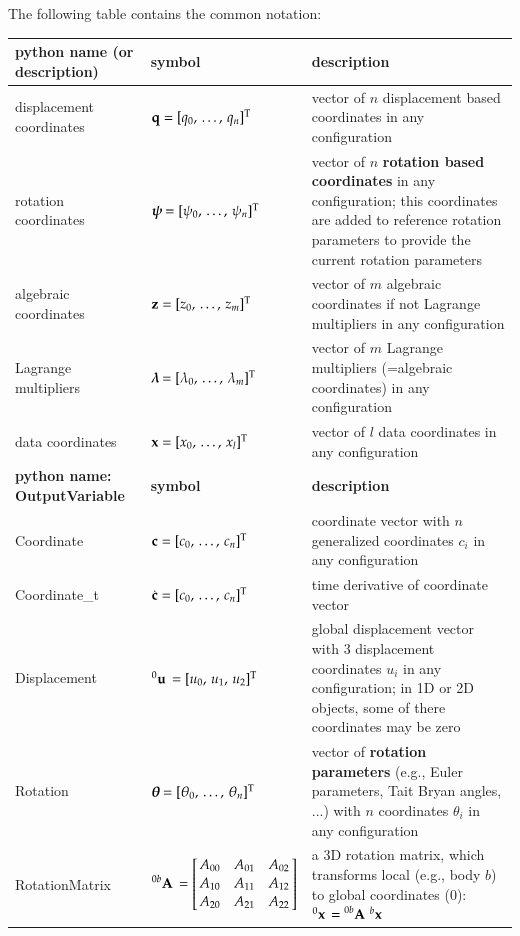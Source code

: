 \documentclass[11pt,a4paper]{book} %
\begin{document}
\noindent The following table contains the common notation: \vspace{-12pt}
\begin{center}
  \footnotesize
  \begin{longtable}{| p{5cm} | p{5cm} | p{6cm} |}
    \hline
    \bf python name (or description) & \bf symbol & \bf description \\ \hline
    displacement coordinates & $\mathbf{q} = [q_0,\, \ldots,\, q_n]^\mathrm{T}$ & vector of $n$ displacement based coordinates in any configuration\\ \hline
    rotation coordinates & $\mbox{\boldmath $\psi$ \unboldmath}\!\! = [\psi_0,\, \ldots,\, \psi_n]^\mathrm{T}$ & vector of $n$ {\bf rotation based coordinates} in any configuration; this coordinates are added to reference rotation parameters to provide the current rotation parameters\\ \hline
    algebraic coordinates & $\mathbf{z} = [z_0,\, \ldots,\, z_m]^\mathrm{T}$ & vector of $m$ algebraic coordinates if not Lagrange multipliers in any configuration\\ \hline
    Lagrange multipliers & $\mbox{\boldmath $\lambda$ \unboldmath}\!\! = [\lambda_0,\, \ldots,\, \lambda_m]^\mathrm{T}$ & vector of $m$ Lagrange multipliers (=algebraic coordinates) in any configuration\\ \hline
    data coordinates & $\mathbf{x} = [x_0,\, \ldots,\, x_l]^\mathrm{T}$ & vector of $l$ data coordinates in any configuration\\ \hline
    \hline %
		\bf python name: OutputVariable & \bf symbol & \bf description \\ \hline
    Coordinate & $\mathbf{c} = [c_0,\, \ldots,\, c_n]^\mathrm{T}$ & coordinate vector with $n$ generalized coordinates $c_i$ in any configuration\\ \hline
    Coordinate\_t & $\dot {\mathbf{c}} = [c_0,\, \ldots,\, c_n]^\mathrm{T}$ & time derivative of coordinate vector\\ \hline
    Displacement & $\prescript{0}{}{\mathbf{u}}\, = [u_0,\, u_1,\, u_2]^\mathrm{T}$ & global displacement vector with 3 displacement coordinates $u_i$ in any configuration; in 1D or 2D objects, some of there coordinates may be zero\\ \hline
    Rotation & $\mbox{\boldmath $\theta$ \unboldmath}\!\! = [\theta_0,\, \ldots,\, \theta_n]^\mathrm{T}$ & vector of {\bf rotation parameters} (e.g., Euler parameters, Tait Bryan angles, ...) with $n$ coordinates $\theta_i$ in any configuration\\ \hline
    RotationMatrix & $\LU{0b}{\Rot} = \mr{A_{00}}{A_{01}}{A_{02}} {A_{10}}{A_{11}}{A_{12}} {A_{20}}{A_{21}}{A_{22}}$ & a 3D rotation matrix, which transforms local (e.g., body $b$) to global coordinates (0): $\prescript{0}{}{\mathbf{x}}\, = \prescript{0b}{}{\mathbf{A}}\, \prescript{b}{}{\mathbf{x}}\,$\\ \hline

\end{longtable}
\end{center}
\end{document}
